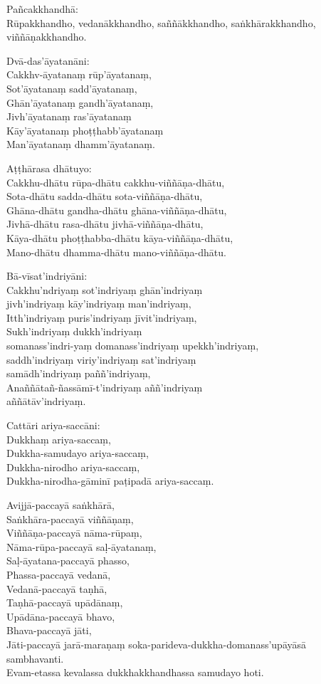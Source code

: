 Pañcakkhandhā:\\
Rūpakkhandho, vedanākkhandho, saññākkhandho, saṅkhārakkhandho, viññāṇakkhandho.

Dvā-das'āyatanāni:\\
Cakkhv-āyatanaṃ rūp'āyatanaṃ,\\
Sot'āyatanaṃ sadd'āyatanaṃ,\\
Ghān'āyatanaṃ gandh'āyatanaṃ,\\
Jivh'āyatanaṃ ras'āyatanaṃ\\
Kāy'āyatanaṃ phoṭṭhabb'āyatanaṃ\\
Man'āyatanaṃ dhamm'āyatanaṃ.

Aṭṭhārasa dhātuyo:\\
Cakkhu-dhātu rūpa-dhātu cakkhu-viññāṇa-dhātu,\\
Sota-dhātu sadda-dhātu sota-viññāṇa-dhātu,\\
Ghāna-dhātu gandha-dhātu ghāna-viññāṇa-dhātu,\\
Jivhā-dhātu rasa-dhātu jivhā-viññāṇa-dhātu,\\
Kāya-dhātu phoṭṭhabba-dhātu kāya-viññāṇa-dhātu,\\
Mano-dhātu dhamma-dhātu mano-viññāṇa-dhātu.

Bā-vīsat'indriyāni:\\
Cakkhu'ndriyaṃ sot'indriyaṃ ghān'indriyaṃ\\
jivh'indriyaṃ kāy'indriyaṃ man'indriyaṃ,\\
Itth'indriyaṃ puris'indriyaṃ jīvit'indriyaṃ,\\
Sukh'indriyaṃ dukkh'indriyaṃ\\
somanass'indri-yaṃ domanass'indriyaṃ upekkh'indriyaṃ,\\
saddh'indriyaṃ viriy'indriyaṃ sat'indriyaṃ\\
samādh'indriyaṃ paññ'indriyaṃ,\\
Anaññātañ-ñassāmī-t'indriyaṃ aññ'indriyaṃ\\
aññātāv'indriyaṃ.

Cattāri ariya-saccāni:\\
Dukkhaṃ ariya-saccaṃ,\\
Dukkha-samudayo ariya-saccaṃ,\\
Dukkha-nirodho ariya-saccaṃ,\\
Dukkha-nirodha-gāminī paṭipadā ariya-saccaṃ.

Avijjā-paccayā saṅkhārā,\\
Saṅkhāra-paccayā viññāṇaṃ,\\
Viññāṇa-paccayā nāma-rūpaṃ,\\
Nāma-rūpa-paccayā saḷ-āyatanaṃ,\\
Saḷ-āyatana-paccayā phasso,\\
Phassa-paccayā vedanā,\\
Vedanā-paccayā taṇhā,\\
Taṇhā-paccayā upādānaṃ,\\
Upādāna-paccayā bhavo,\\
Bhava-paccayā jāti,\\
Jāti-paccayā jarā-maraṇaṃ soka-parideva-dukkha-domanass'upāyāsā sambhavanti.\\
Evam-etassa kevalassa dukkhakkhandhassa samudayo hoti.


